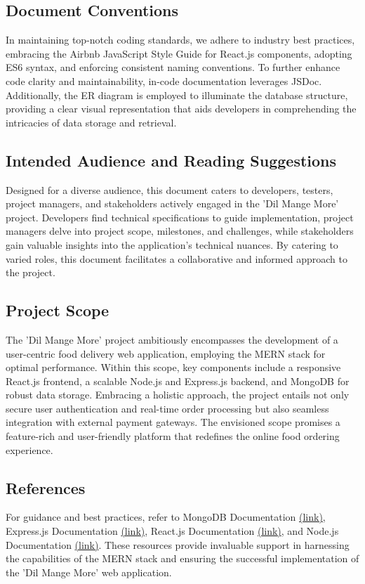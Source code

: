 \documentclass{article}
\begin{document}
\subsection{Document Conventions}
In maintaining top-notch coding standards, we adhere to industry best practices, embracing the Airbnb JavaScript Style Guide for React.js components, adopting ES6 syntax, and enforcing consistent naming conventions. To further enhance code clarity and maintainability, in-code documentation leverages JSDoc. Additionally, the ER diagram is employed to illuminate the database structure, providing a clear visual representation that aids developers in comprehending the intricacies of data storage and retrieval.

\subsection{Intended Audience and Reading Suggestions}
Designed for a diverse audience, this document caters to developers, testers, project managers, and stakeholders actively engaged in the 'Dil Mange More' project. Developers find technical specifications to guide implementation, project managers delve into project scope, milestones, and challenges, while stakeholders gain valuable insights into the application's technical nuances. By catering to varied roles, this document facilitates a collaborative and informed approach to the project.

\subsection{Project Scope}
The 'Dil Mange More' project ambitiously encompasses the development of a user-centric food delivery web application, employing the MERN stack for optimal performance. Within this scope, key components include a responsive React.js frontend, a scalable Node.js and Express.js backend, and MongoDB for robust data storage. Embracing a holistic approach, the project entails not only secure user authentication and real-time order processing but also seamless integration with external payment gateways. The envisioned scope promises a feature-rich and user-friendly platform that redefines the online food ordering experience.

\subsection{References}
For guidance and best practices, refer to MongoDB Documentation \href{https://www.mongodb.com/docs/}{(link)}, Express.js Documentation \href{https://expressjs.com/}{(link)}, React.js Documentation \href{https://reactjs.org/docs/getting-started.html}{(link)}, and Node.js Documentation \href{https://nodejs.org/docs/latest/api/}{(link)}. These resources provide invaluable support in harnessing the capabilities of the MERN stack and ensuring the successful implementation of the 'Dil Mange More' web application.
\end{document}
